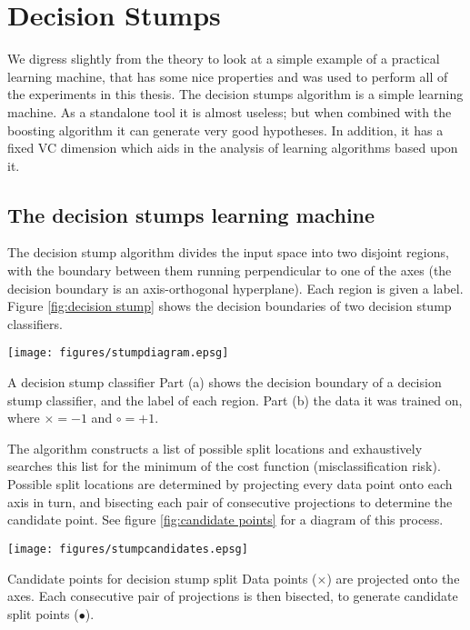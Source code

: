 
\chapter{Decision Stumps}

We digress slightly from the theory to look at a simple example of a
practical learning machine, that has some nice properties and was used
to perform all of the experiments in this thesis.
The decision stumps algorithm is a simple learning
machine.  As a standalone tool it is almost useless; but when
combined with the boosting algorithm it can generate very good
hypotheses.  In addition, it has a fixed VC dimension which aids in
the analysis of learning algorithms based upon it.

\section{The decision stumps learning machine}

The decision stump algorithm divides the input space
into two disjoint regions, with the boundary between them running
perpendicular to one of the axes (the decision boundary is an
axis-orthogonal hyperplane).  Each region is given a label.
Figure \ref{fig:decision stump} shows the decision boundaries of two
decision stump classifiers.

\begin{linefigure}
\begin{center}
\texttt{[image: figures/stumpdiagram.epsg]}
\end{center}
\begin{capt}{A decision stump classifier}
Part (a) shows the decision boundary of a decision stump classifier,
and the label of each region.  Part (b) the data it was trained on,
where $\times = -1$ and $\circ = +1$.
\end{capt}
\label{fig:decision stump}
\end{linefigure}

The algorithm constructs a list of possible split locations and
exhaustively searches this list for the minimum of the cost function
(misclassification risk).  Possible split locations are determined by
projecting every data point onto each axis in turn, and bisecting each
pair of consecutive projections to determine the candidate point.  See
figure \ref{fig:candidate points} for a diagram of this process.

\begin{linefigure}
\begin{center}
\texttt{[image: figures/stumpcandidates.epsg]}
\end{center}
\begin{capt}{Candidate points for decision stump split}
Data points ($\times$) are projected onto the axes.  Each consecutive
pair of projections is then bisected, to generate candidate split
points ($\bullet$).
\end{capt}
\label{fig:candidate points}
\end{linefigure}


